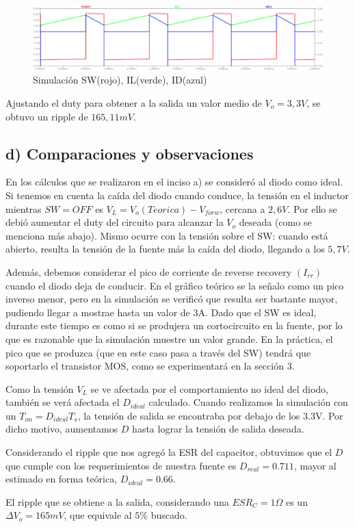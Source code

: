 \documentclass[e4_tp1_main.tex]{subfiles}
\begin{document}
\begin{figure}[H]
  \centering
    \includegraphics[scale = 0.4]{Imagenes/punto2/SW&IL&ID}
  \caption{Simulaci\'on SW(rojo), IL(verde), ID(azul)}
  \label{fig:SW&IL}
\end{figure}

Ajustando el duty para obtener a la salida un valor medio de $V_o = 3,3V$, se obtuvo un ripple de $165,11mV$.

\subsection*{d) Comparaciones y observaciones}

En los c\'alculos que se realizaron en el inciso a) se consider\'o al diodo como ideal. Si tenemos en cuenta la ca\'ida del diodo cuando conduce, la tensi\'on en el inductor mientras $SW=OFF$ es $V_{L}=V_o(Teorica)-V_{forw}$, cercana a $2,6V$. Por ello se debió aumentar el duty del circuito para alcanzar la $V_o$ deseada (como se menciona más abajo). Mismo ocurre con la tensión sobre el SW: cuando está abierto, resulta la tensión de la fuente más la caída del diodo, llegando a los $5,7V$.\par 
Adem\'as, debemos considerar el pico de corriente de reverse recovery $(I_{rr})$ cuando el diodo deja de conducir. En el gráfico teórico se la señalo como un pico inverso menor, pero en la simulación se verificó que resulta ser bastante mayor, pudiendo llegar a mostrae hasta un valor de 3A. Dado que el SW es ideal, durante este tiempo es como si se produjera un cortocircuito en la fuente, por lo que es razonable que la simulación muestre un valor grande. En la práctica, el pico que se produzca (que en este caso pasa a través del SW) tendrá que soportarlo el transistor MOS, como se experimentará en la sección 3. 



Como la tensi\'on $V_L$ se ve afectada por el comportamiento no ideal del diodo, tambi\'en se ver\'a afectada el $D_{ideal}$ calculado.
Cuando realizamos la simulaci\'on con un $T_{on}=D_{ideal}T_s$, la tensi\'on de salida se encontraba por debajo de los 3.3V. Por dicho motivo, aumentamos $D$ hasta lograr la tensi\'on de salida deseada. 

Considerando el ripple que nos agreg\'o la ESR del capacitor, obtuvimos que el $D$ que cumple con los requerimientos de nuestra fuente es $D_{real}=0.711$, mayor al estimado en forma teórica, $D_{ideal} = 0.66$.

El ripple que se obtiene a la salida, considerando una $ESR_C=1\Omega$ es un $\Delta V_o = 165mV$, que equivale al $5\%$ buscado.






\newpage
\end{document}
